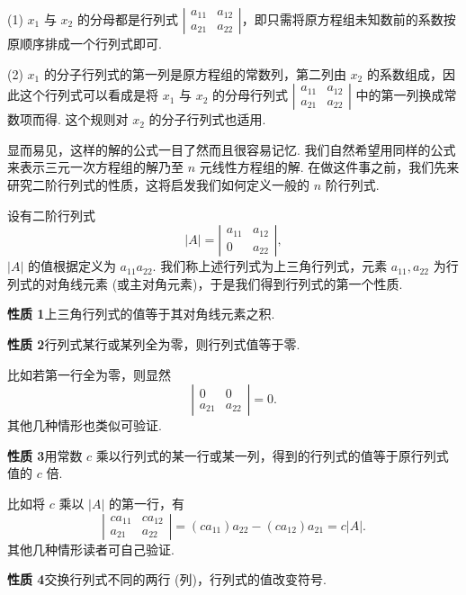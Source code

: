 \documentclass[UTF8, 12pt, fontset=fandol, oneside]{ctexart}
\begin{document}
(1) $x_1$ 与 $x_2$ 的分母都是行列式 $\left|\begin{array}{cc}a_{11}&a_{12}\\a_{21}&a_{22}\end{array}\right|$，即只需将原方程组未知数前的系数按原顺序排成一个行列式即可.

(2) $x_1$ 的分子行列式的第一列是原方程组的常数列，第二列由 $x_2$ 的系数组成，因此这个行列式可以看成是将 $x_1$ 与 $x_2$ 的分母行列式 $\left|\begin{array}{cc}a_{11}&a_{12}\\a_{21}&a_{22}\end{array}\right|$ 中的第一列换成常数项而得. 这个规则对 $x_2$ 的分子行列式也适用.

显而易见，这样的解的公式一目了然而且很容易记忆. 我们自然希望用同样的公式来表示三元一次方程组的解乃至 $n$ 元线性方程组的解. 在做这件事之前，我们先来研究二阶行列式的性质，这将启发我们如何定义一般的 $n$ 阶行列式.

设有二阶行列式
\[
|A|=\left|\begin{array}{cc}
a_{11} & a_{12}\\
0 & a_{22}
\end{array}\right|,
\]
$|A|$ 的值根据定义为 $a_{11}a_{22}$. 我们称上述行列式为上三角行列式，元素 $a_{11},a_{22}$ 为行列式的对角线元素 (或主对角元素)，于是我们得到行列式的第一个性质.

\noindent\textbf{性质 1}\quad 上三角行列式的值等于其对角线元素之积.

\noindent\textbf{性质 2}\quad 行列式某行或某列全为零，则行列式值等于零.

比如若第一行全为零，则显然
\[
\left|\begin{array}{cc}
0 & 0\\
a_{21} & a_{22}
\end{array}\right|=0.
\]
其他几种情形也类似可验证.

\noindent\textbf{性质 3}\quad 用常数 $c$ 乘以行列式的某一行或某一列，得到的行列式的值等于原行列式值的 $c$ 倍.

比如将 $c$ 乘以 $|A|$ 的第一行，有
\[
\left|\begin{array}{cc}
ca_{11} & ca_{12}\\
a_{21} & a_{22}
\end{array}\right|
=(ca_{11})a_{22}-(ca_{12})a_{21}=c|A|.
\]
其他几种情形读者可自己验证.

\noindent\textbf{性质 4}\quad 交换行列式不同的两行 (列)，行列式的值改变符号.
\end{document}
